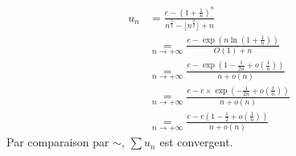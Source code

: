 \documentclass[../main.tex]{subfiles}
\begin{document}
\begin{align*}
    u_n &= \frac{e - \left( 1 + \frac{1}{n} \right)^n}{n^{\frac{3}{2}} - \lfloor n^{\frac{3}{2}} \rfloor + n} \\
    &\underset{n\to +\infty}{=} \frac{e - \exp \left( n \ln \left( 1 + \frac{1}{n} \right) \right)}{O(1) + n} \\
    &\underset{n\to +\infty}{=} \frac{e - \exp \left( 1 - \frac{1}{2n} + o \left( \frac{1}{n} \right) \right)}{n + o(n)} \\
    &\underset{n\to +\infty}{=} \frac{e - e \times \exp \left( -\frac{1}{2n} + o \left( \frac{1}{n} \right) \right)}{n + o(n)} \\
    &\underset{n\to +\infty}{=} \frac{e - e \left( 1 - \frac{1}{2} + o \left( \frac{1}{n} \right) \right)}{n + o(n)} 
\end{align*}
Par comparaison par $\sim$, $\sum u_n$ est convergent. 
\end{document}

